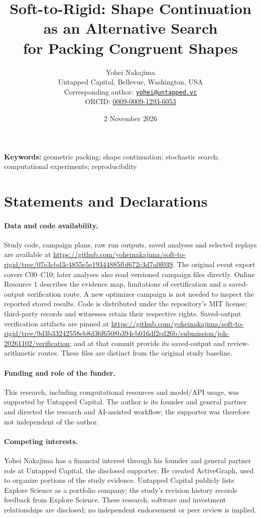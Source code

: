 \documentclass[11pt]{article}
\title{Soft-to-Rigid: Shape Continuation as an Alternative Search\\ for Packing Congruent Shapes}
\author{Yohei Nakajima\\\small Untapped Capital, Bellevue, Washington, USA\\\small Corresponding author: \href{mailto:yohei@untapped.vc}{\texttt{yohei@untapped.vc}}\\\small ORCID: \href{https://orcid.org/0009-0009-1293-6053}{0009-0009-1293-6053}}
\date{2 November 2026}
\begin{document}
\maketitle

\begin{abstract}

\end{abstract}
\noindent\textbf{Keywords:} geometric packing; shape continuation; stochastic search; computational experiments; reproducibility



\sloppy
\section*{Statements and Declarations}\label{sec:declarations}
\paragraph{Data and code availability.} Study code, campaign plans, raw run outputs, saved analyses and selected replays are available at \url{https://github.com/yoheinakajima/soft-to-rigid/tree/07e3cbd3c4855e5e19344885fbf672c3d7a0f039}. The original event export covers C00--C10; later analyses also read versioned campaign files directly. Online Resource 1 describes the evidence map, limitations of certification and a saved-output verification route. A new optimizer campaign is not needed to inspect the reported stored results. Code is distributed under the repository's MIT license; third-party records and witnesses retain their respective rights. Saved-output verification artifacts are pinned at \url{https://github.com/yoheinakajima/soft-to-rigid/tree/9d3b33242558eb8d36f6508b394cb016df2cd26b/submission/joh-20261102/verification};  and  at that commit provide its saved-output and review-arithmetic routes. These files are distinct from the original study baseline.
\paragraph{Funding and role of the funder.} This research, including computational resources and model/API usage, was supported by Untapped Capital. The author is its founder and general partner and directed the research and AI-assisted workflow; the supporter was therefore not independent of the author.
\paragraph{Competing interests.} Yohei Nakajima has a financial interest through his founder and general partner role at Untapped Capital, the disclosed supporter. He created ActiveGraph, used to organize portions of the study evidence. Untapped Capital publicly lists Explore Science as a portfolio company; the study's revision history records feedback from Explore Science. These research, software and investment relationships are disclosed; no independent endorsement or peer review is implied.
\end{document}
